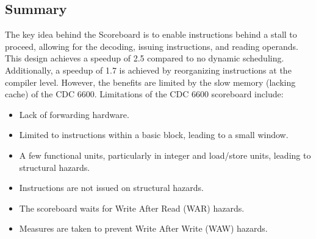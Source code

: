\subsection{Summary}
The key idea behind the Scoreboard is to enable instructions behind a stall to proceed, allowing for the decoding, issuing instructions, and reading operands. This design achieves a speedup of 2.5 compared to no dynamic scheduling. Additionally, a speedup of 1.7 is achieved by reorganizing instructions at the compiler level. However, the benefits are limited by the slow memory (lacking cache) of the CDC 6600.
Limitations of the CDC 6600 scoreboard include:
\begin{itemize}
    \item Lack of forwarding hardware.
    \item Limited to instructions within a basic block, leading to a small window.
    \item A few functional units, particularly in integer and load/store units, leading to structural hazards.
    \item Instructions are not issued on structural hazards.
    \item The scoreboard waits for Write After Read (WAR) hazards.
    \item Measures are taken to prevent Write After Write (WAW) hazards.
\end{itemize}
